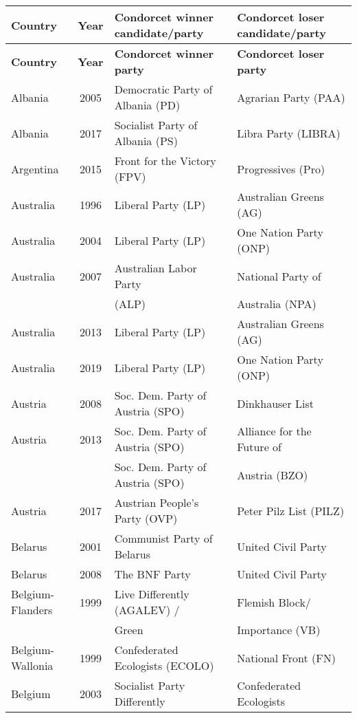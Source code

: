 \scriptsize{
\begin{longtable}{|l|c|l|l|}  \toprule 
	\textbf{Country} & \textbf{Year} & \textbf{Condorcet winner candidate/party} & \textbf{Condorcet loser candidate/party} \\ \midrule 	\endfirsthead	\midrule
\textbf{Country} & \textbf{Year} & \textbf{Condorcet winner party} & \textbf{Condorcet loser party} \\		\midrule \endhead \midrule \endfoot \bottomrule
\endlastfoot \midrule
Albania & 2005 &   Democratic Party of Albania (PD) &   Agrarian Party (PAA) \\ 
  Albania & 2017 &   Socialist Party of Albania (PS) &   Libra Party (LIBRA) \\ 
%
Argentina & 2015 &   Front for the Victory (FPV) &   Progressives (Pro) \\ 
%
Australia & 1996 &   Liberal Party (LP) &    Australian Greens (AG) \\ 
Australia & 2004 &   Liberal Party (LP) &   One Nation Party (ONP) \\ 
Australia & 2007 &   Australian Labor Party  &   National Party of     \\ 
      &  &     (ALP)  &     Australia (NPA)   \\ 
Australia & 2013 &   Liberal Party (LP) &   Australian Greens (AG) \\ 
Australia & 2019 &   Liberal Party (LP) &   One Nation Party (ONP) \\ 
%
Austria & 2008 &   Soc. Dem. Party of Austria (SPO) &   Dinkhauser List  \\ 
Austria & 2013 &   Soc. Dem. Party of Austria (SPO) &   Alliance for the Future of   \\ 
    &  &   Soc. Dem. Party of Austria (SPO) &     Austria (BZO) \\ 
Austria & 2017 &   Austrian People's Party (OVP)   &   Peter Pilz List (PILZ) \\ 
%
Belarus & 2001 &   Communist Party of Belarus  &   United Civil Party  \\ 
Belarus & 2008 &   The BNF Party  &   United Civil Party  \\  
%
Belgium-Flanders & 1999 & Live Differently (AGALEV)  /  &  Flemish Block/ \\ 
   &   &   Green  &   Importance (VB)\\ 
Belgium-Wallonia & 1999 & Confederated Ecologists (ECOLO)   &  National Front (FN)   \\ 
  Belgium & 2003 &   Socialist Party Differently   &   Confederated Ecologists   \\ 

\end{longtable}}
